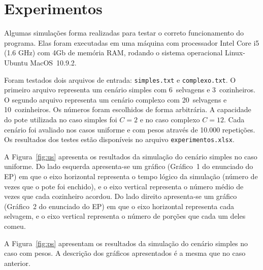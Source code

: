 \documentclass[11pt,a4paper]{article}
\begin{document}

\section{Experimentos}
\label{sec:exp}

Algumas simulações forma realizadas para testar o correto funcionamento do programa. Elas foram 
executadas em uma máquina com processador Intel Core i5 (1.6 GHz) com 4Gb de memória RAM, rodando o 
sistema operacional Linux-Ubuntu MacOS~10.9.2.

Foram testados dois arquivos de entrada: \verb|simples.txt| e \verb|complexo.txt|. O primeiro 
arquivo representa um cenário simples com 6~selvagens e 3~cozinheiros. O segundo arquivo representa 
um cenário complexo com 20~selvagens e 10~cozinheiros. Os números foram escolhidos de forma 
arbitrária. A capacidade do pote utilizada no caso simples foi $C = 2$ e no caso complexo $C = 12$. 
Cada cenário foi avaliado nos casos uniforme e com pesos através de 10.000 repetições. Os resultados
dos testes estão disponíveis no arquivo \verb|experimentos.xlsx|.

A Figura~\ref{fig:us} apresenta os resultados da simulação do cenário simples no caso uniforme. Do
lado esquerda apresenta-se um gráfico (Gráfico~1 do enunciado do EP) em que o eixo horizontal
representa o tempo lógico da simulação (número de vezes que o pote foi enchido), e o eixo vertical
representa o  número médio de vezes que cada cozinheiro acordou. Do lado direito apresenta-se um
gráfico (Gráfico~2 do enunciado do EP) em que o eixo horizontal representa cada selvagem, e o eixo
vertical  representa o número de porções que cada um deles comeu.

A Figura~\ref{fig:ps} apresentam os resultados da simulação do cenário simples no caso com pesos. A 
descrição dos gráficos apresentados é a mesma que no caso anterior.
\end{document}
